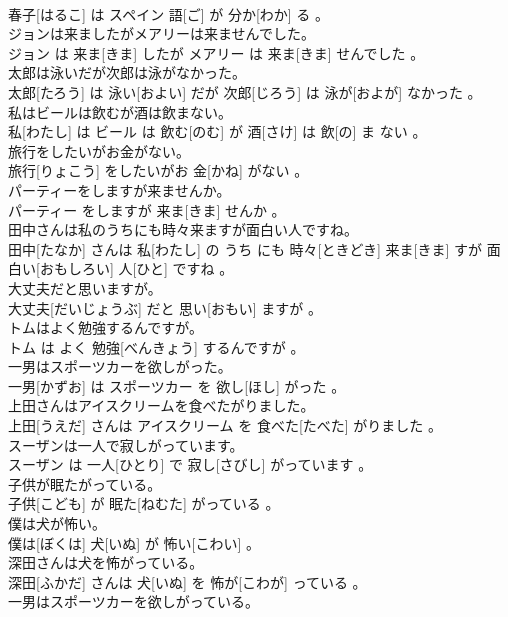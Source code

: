 \documentclass[8pt]{extreport}
\begin{document}
\begin{CJK}{UTF8}{min}
\\	春子[はるこ] は スペイン 語[ご] が 分か[わか] る 。
\\	ジョンは来ましたがメアリーは来ませんでした。	
\\	ジョン は 来ま[きま] したが メアリー は 来ま[きま] せんでした 。
\\	太郎は泳いだが次郎は泳がなかった。	
\\	太郎[たろう] は 泳い[およい] だが 次郎[じろう] は 泳が[およが] なかった 。
\\	私はビールは飲むが酒は飲まない。	
\\	私[わたし] は ビール は 飲む[のむ] が 酒[さけ] は 飲[の] ま ない 。
\\	旅行をしたいがお金がない。	
\\	旅行[りょこう] をしたいがお 金[かね] がない 。
\\	パーティーをしますが来ませんか。	
\\	パーティー をしますが 来ま[きま] せんか 。
\\	田中さんは私のうちにも時々来ますが面白い人ですね。	
\\	田中[たなか] さんは 私[わたし] の うち にも 時々[ときどき] 来ま[きま] すが 面白い[おもしろい] 人[ひと] ですね 。
\\	大丈夫だと思いますが。	
\\	大丈夫[だいじょうぶ] だと 思い[おもい] ますが 。
\\	トムはよく勉強するんですが。	
\\	トム は よく 勉強[べんきょう] するんですが 。
\\	一男はスポーツカーを欲しがった。	
\\	一男[かずお] は スポーツカー を 欲し[ほし] がった 。
\\	上田さんはアイスクリームを食べたがりました。	
\\	上田[うえだ] さんは アイスクリーム を 食べた[たべた] がりました 。
\\	スーザンは一人で寂しがっています。	
\\	スーザン は 一人[ひとり] で 寂し[さびし] がっています 。
\\	子供が眠たがっている。	
\\	子供[こども] が 眠た[ねむた] がっている 。
\\	僕は犬が怖い。	
\\	僕は[ぼくは] 犬[いぬ] が 怖い[こわい] 。
\\	深田さんは犬を怖がっている。	
\\	深田[ふかだ] さんは 犬[いぬ] を 怖が[こわが] っている 。
\\	一男はスポーツカーを欲しがっている。	

\end{CJK}
\end{document}
